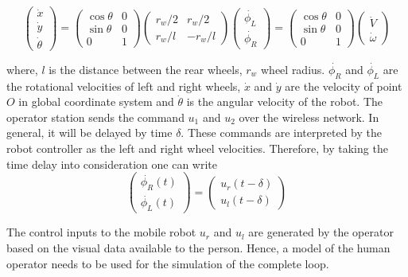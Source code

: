 \begin{equation}
\label{eqn:KinematicModelOfRobot}
\begin{pmatrix}
\dot{x}\\ 
\dot{y}\\ 
\dot{\theta}
\end{pmatrix}
=
\begin{pmatrix}
\cos \theta & 0 \\
\sin \theta & 0 \\
0& 1
\end{pmatrix}
\begin{pmatrix}
r_w/2 & r_w/2\\
r_w/ l & -r_w/l
\end{pmatrix}
\begin{pmatrix}
\dot{\phi_L}\\
\dot{\phi_R}
\end{pmatrix}
=
\begin{pmatrix}
\cos \theta & 0 \\
\sin \theta & 0 \\
0& 1
\end{pmatrix}
\begin{pmatrix}
\dot{V}\\
\dot{\omega}
\end{pmatrix}
\end{equation}


where,  $l$ is the distance between the rear wheels, $r_w$ wheel radius. $\dot{\phi_R}$ and $\dot{\phi_L} $ are the rotational velocities of left and right wheels, $\dot{x}$ and  $\dot{y}$ are the velocity of point $O$ in global coordinate system and $\dot{\theta}$ is the angular velocity of the robot. 
The operator station sends the command $u_1$ and $u_2$ over the wireless network. In general, it will be delayed by time $\delta$. These commands are interpreted by the robot controller as the left and right wheel velocities.  Therefore, by taking the time delay into consideration one can write
\begin{equation}
\begin{pmatrix}
\dot{\phi_R}(t) \\
 \dot{\phi_L}(t)
\end{pmatrix}
=
\begin{pmatrix}
u_r(t-\delta)\\
u_l(t-\delta)
\end{pmatrix}
\end{equation}

The control inputs to the mobile robot  $u_r$ and $u_l$ are generated by the operator based on the visual data available to the person. Hence, a model of the human operator needs to be used for the simulation of the complete loop.

